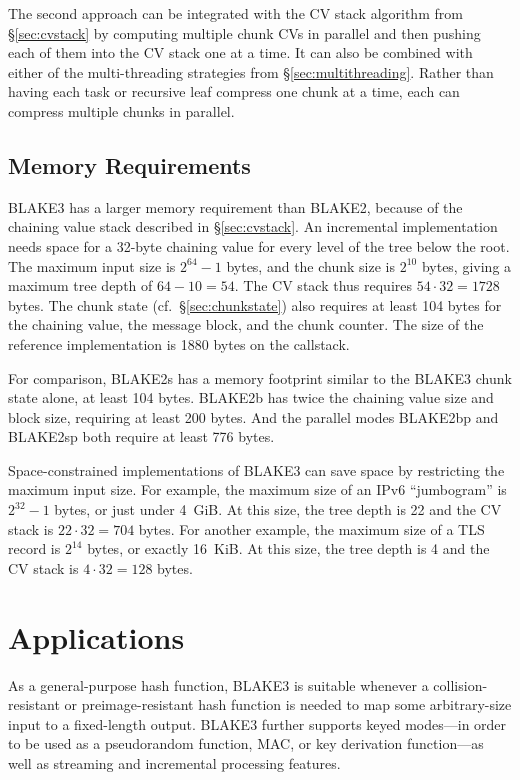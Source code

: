 \documentclass[11pt,notitlepage,a4paper]{article}
\begin{document}
The second approach can be integrated with the CV stack algorithm from
\S\ref{sec:cvstack} by computing multiple chunk CVs in parallel and then
pushing each of them into the CV stack one at a time. It can also be combined
with either of the multi-threading strategies from \S\ref{sec:multithreading}.
Rather than having each task or recursive leaf compress one chunk at a time,
each can compress multiple chunks in parallel.

\subsection{Memory Requirements}\label{sec:memory}

BLAKE3 has a larger memory requirement than BLAKE2, because of the chaining
value stack described in \S\ref{sec:cvstack}. An incremental implementation
needs space for a 32-byte chaining value for every level of the tree below the
root. The maximum input size is $2^{64}-1$ bytes, and the chunk size is
$2^{10}$ bytes, giving a maximum tree depth of $64 - 10 = 54$. The CV stack
thus requires $54 \cdot 32 = 1728$ bytes. The chunk state
(cf.~\S\ref{sec:chunkstate}) also requires at least 104 bytes for the chaining
value, the message block, and the chunk counter. The size of the reference
implementation is 1880 bytes on the callstack.

For comparison, BLAKE2s has a memory footprint similar to the BLAKE3 chunk
state alone, at least 104 bytes. BLAKE2b has twice the chaining value size and
block size, requiring at least 200 bytes. And the parallel modes BLAKE2bp and
BLAKE2sp both require at least 776 bytes.

Space-constrained implementations of BLAKE3 can save space by restricting the
maximum input size. For example, the maximum size of an IPv6 ``jumbogram'' is
$2^{32}-1$ bytes, or just under 4~GiB. At this size, the tree depth is 22 and
the CV stack is $22 \cdot 32 = 704$ bytes. For another example, the maximum
size of a TLS record is $2^{14}$ bytes, or exactly 16~KiB. At this size, the
tree depth is 4 and the CV stack is $4 \cdot 32 = 128$ bytes.

\section{Applications}\label{sec:applications}

As a general-purpose hash function, BLAKE3 is suitable whenever a
collision-resistant or preimage-resistant hash function is needed to map
some arbitrary-size input to a fixed-length output.
BLAKE3 further supports keyed modes---in order to be used as a pseudorandom
function, MAC, or key derivation function---as well as streaming and
incremental processing features.
\end{document}

